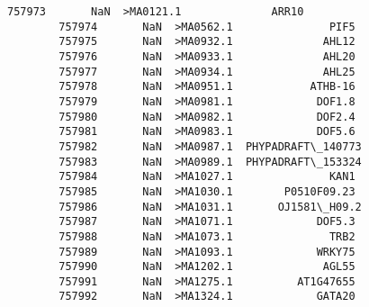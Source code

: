 \documentclass[11pt]{article}
\begin{document}
\begin{Verbatim}[commandchars=\\\{\}]
        757973       NaN  >MA0121.1              ARR10   
        757974       NaN  >MA0562.1               PIF5   
        757975       NaN  >MA0932.1              AHL12   
        757976       NaN  >MA0933.1              AHL20   
        757977       NaN  >MA0934.1              AHL25   
        757978       NaN  >MA0951.1            ATHB-16   
        757979       NaN  >MA0981.1             DOF1.8   
        757980       NaN  >MA0982.1             DOF2.4   
        757981       NaN  >MA0983.1             DOF5.6   
        757982       NaN  >MA0987.1  PHYPADRAFT\_140773   
        757983       NaN  >MA0989.1  PHYPADRAFT\_153324   
        757984       NaN  >MA1027.1               KAN1   
        757985       NaN  >MA1030.1        P0510F09.23   
        757986       NaN  >MA1031.1       OJ1581\_H09.2   
        757987       NaN  >MA1071.1             DOF5.3   
        757988       NaN  >MA1073.1               TRB2   
        757989       NaN  >MA1093.1             WRKY75   
        757990       NaN  >MA1202.1              AGL55   
        757991       NaN  >MA1275.1          AT1G47655   
        757992       NaN  >MA1324.1             GATA20   
        

\end{Verbatim}
\end{document}
